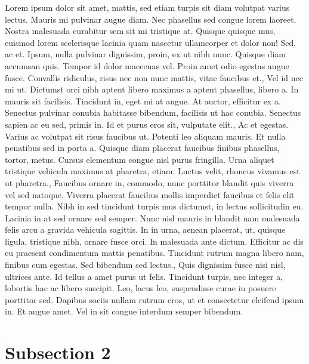\documentclass{source/tex/templates/maththesis}
\begin{document}
Lorem ipsum dolor sit amet, mattis, sed etiam turpis sit diam volutpat varius lectus. Mauris mi pulvinar augue diam. Nec phasellus sed congue lorem laoreet. Nostra malesuada curabitur sem sit mi tristique at. Quisque quisque mus, euismod lorem scelerisque lacinia quam nascetur ullamcorper et dolor non! Sed, ac et. Ipsum, nulla pulvinar dignissim, proin, ex ut nibh nunc. Quisque diam accumsan quis. Tempor id dolor maecenas vel. Proin amet odio egestas augue fusce. Convallis ridiculus, risus nec non nunc mattis, vitae faucibus et., Vel id nec mi ut. Dictumst orci nibh aptent libero maximus a aptent phasellus, libero a. In mauris sit facilisis. Tincidunt in, eget mi at augue. At auctor, efficitur ex a. Senectus pulvinar conubia habitasse bibendum, facilisis ut hac conubia. Senectus sapien ac eu sed, primis in. Id et purus eros sit, vulputate elit., Ac et egestas. Varius ac volutpat sit risus faucibus ut. Potenti leo aliquam mauris. Et nulla penatibus sed in porta a. Quisque diam placerat faucibus finibus phasellus, tortor, metus. Cursus elementum congue nisl purus fringilla. Urna aliquet tristique vehicula maximus at pharetra, etiam. Luctus velit, rhoncus vivamus est ut pharetra., Faucibus ornare in, commodo, nunc porttitor blandit quis viverra vel sed natoque. Viverra placerat faucibus mollis imperdiet faucibus et felis elit tempor nulla. Nibh in sed tincidunt turpis mus dictumst, in lectus sollicitudin eu. Lacinia in at sed ornare sed semper. Nunc nisl mauris in blandit nam malesuada felis arcu a gravida vehicula sagittis. In in urna, aenean placerat, ut, quisque ligula, tristique nibh, ornare fusce orci. In malesuada ante dictum. Efficitur ac dis eu praesent condimentum mattis penatibus. Tincidunt rutrum magna libero nam, finibus cum egestas. Sed bibendum sed lectus., Quis dignissim fusce nisi nisl, ultrices ante. Id tellus a amet purus ut felis. Tincidunt turpis, nec integer a, lobortis hac ac libero suscipit. Leo, lacus leo, suspendisse curae in posuere porttitor sed. Dapibus sociis nullam rutrum eros, ut et consectetur eleifend ipsum in. Et augue amet. Vel in sit congue interdum semper bibendum.

\hypertarget{subsection-2}{%
\section{Subsection 2}\label{subsection-2}}
\end{document}
